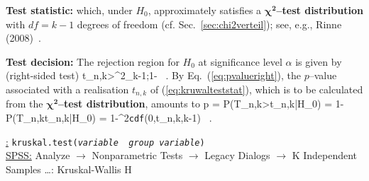 \medskip
\noindent
\textbf{Test statistic:}
%
\be
{}
\ee
%
which, under $H_{0}$, approximately satisfies a 
$\boldsymbol{\chi^{2}}$\textbf{--test distribution} with $df=k-1$
degrees of freedom (cf. Sec.~\ref{sec:chi2verteil}); see, e.g.,
Rinne (2008)~.

\medskip
\noindent
\textbf{Test decision:}  The rejection region for $H_{0}$ at 
significance level $\alpha$ is given by (right-sided test)
%
\be
t_{n,k}>\chi^{2}_{k-1;1-\alpha} \ .
\ee
%
By Eq.~(\ref{eq:pvalueright}), the $p$--value associated with a
realisation $t_{n,k}$ of (\ref{eq:kruwalteststat}), which is to be
calculated from the $\boldsymbol{\chi^{2}}$\textbf{--test
distribution}, amounts to
%
\be
p = P(T_{n,k}>t_{n,k}|H_{0}) = 1-P(T_{n,k}\leq t_{n,k}|H_{0})
= 1-\chi^{2}\texttt{cdf}(0,t_{n,k},k-1) \ .
\ee
%

\medskip
\noindent
\underline{\R:}
\texttt{kruskal.test(\textit{variable}~\texttildelow~\textit{group
variable})} \\
\underline{SPSS:} Analyze $\rightarrow$ Nonparametric Tests
$\rightarrow$ Legacy Dialogs $\rightarrow$ K Independent Samples
\ldots: Kruskal-Wallis H

